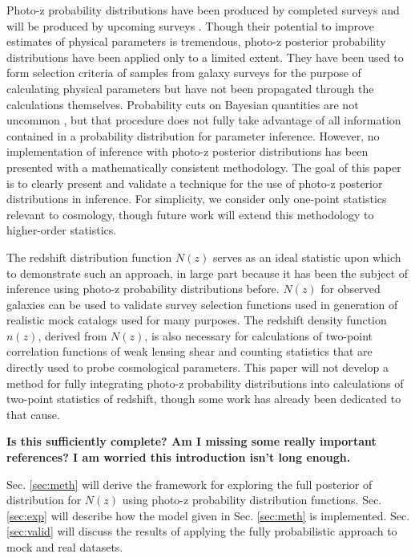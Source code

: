 \documentclass[preprint]{aastex}
\begin{document}
Photo-z probability distributions have been produced by completed surveys 
\citep{Hildebrandt2012, Sheldon2012} and will be produced by upcoming surveys 
\citep{LSSTScienceCollaboration2009, CarrascoKind2014a, Masters2015a}.  Though 
their potential to improve estimates of physical parameters is tremendous, 
photo-z posterior probability distributions have been applied only to a limited 
extent.  They have been used to form selection criteria of samples from galaxy 
surveys for the purpose of calculating physical parameters but have not been 
propagated through the calculations themselves.  
\citep{VanBreukelen2009,Viironen2015}  Probability cuts on Bayesian quantities 
are not uncommon \citep{Leung2015, DiPompeo2015a}, but that procedure does not 
fully take advantage of all information contained in a probability distribution 
for parameter inference.  However, no implementation of inference with photo-z 
posterior distributions has been presented with a mathematically consistent 
methodology.  The goal of this paper is to clearly present and validate a 
technique for the use of photo-z posterior distributions in inference.  For 
simplicity, we consider only one-point statistics relevant to cosmology, though 
future work will extend this methodology to higher-order statistics.

The redshift distribution function $N(z)$ serves as an ideal statistic upon 
which to demonstrate such an approach, in large part because it has been the 
subject of inference using photo-z probability distributions before.  
\citep{Sheldon2012, Hildebrandt2012, Kelly2014, Benjamin2013, Bonnett2015a, 
Viironen2015, Asorey2016}  $N(z)$ for observed galaxies can be used to validate 
survey selection functions used in generation of realistic mock catalogs used 
for many purposes.  \citep{Norberg2002}  The redshift density function $n(z)$, 
derived from $N(z)$, is also necessary for calculations of two-point 
correlation functions of weak lensing shear and counting statistics that are 
directly used to probe cosmological parameters.  \citep{Masters2015}  This 
paper will not develop a method for fully integrating photo-z probability 
distributions into calculations of two-point statistics of redshift, though 
some work has already been dedicated to that cause.  \citep{Myers2009}

\textbf{Is this sufficiently complete?  Am I missing some really important 
references?  I am worried this introduction isn't long enough.}

Sec. \ref{sec:meth} will derive the framework for exploring the full posterior 
of distribution for $N(z)$ using photo-z probability distribution functions.  
Sec. \ref{sec:exp} will describe how the model given in Sec. \ref{sec:meth} is 
implemented.  Sec. \ref{sec:valid} will discuss the results of applying the 
fully probabilistic approach to mock and real datasets.
\end{document}
